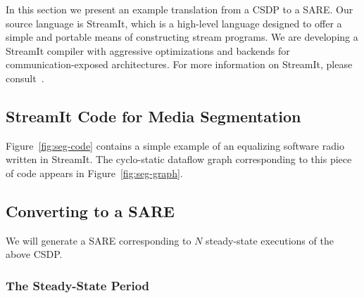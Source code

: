 In this section we present an example translation from a CSDP to a
SARE.  Our source language is StreamIt, which is a high-level language
designed to offer a simple and portable means of constructing stream
programs.  We are developing a StreamIt compiler with aggressive
optimizations and backends for communication-exposed architectures.
For more information on StreamIt, please
consult~\cite{streamitcc,Gordo02}.

\subsection{StreamIt Code for Media Segmentation}

Figure~\ref{fig:seg-code} contains a simple example of an equalizing
software radio written in StreamIt.  The cyclo-static dataflow graph
corresponding to this piece of code appears in
Figure~\ref{fig:seg-graph}.


\subsection{Converting to a SARE}

We will generate a SARE corresponding to $N$ steady-state executions
of the above CSDP.

\subsubsection{The Steady-State Period}

